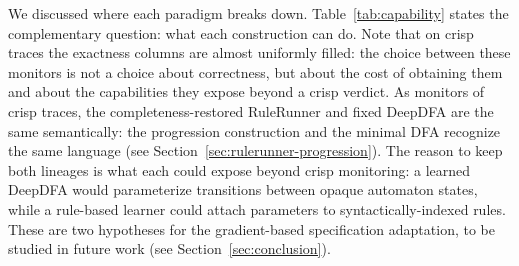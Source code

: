 We discussed where each paradigm breaks down. Table~\ref{tab:capability} states the
complementary question: what each construction can do. Note that on crisp traces the exactness columns are almost uniformly
filled: the choice between these monitors is not a choice about correctness, but about the cost of obtaining them and about the
capabilities they expose beyond a crisp verdict.
%
As monitors of crisp traces, the completeness-restored RuleRunner and fixed DeepDFA are the same semantically: the progression construction and the minimal DFA recognize the same \ltlf language (see Section~\ref{sec:rulerunner-progression}). The reason to keep both lineages is what each could expose beyond crisp monitoring: a learned DeepDFA would parameterize transitions between opaque automaton states, while a rule-based learner could attach parameters to syntactically-indexed rules. These are two hypotheses for the gradient-based specification adaptation, to be studied in future work (see Section~\ref{sec:conclusion}).

